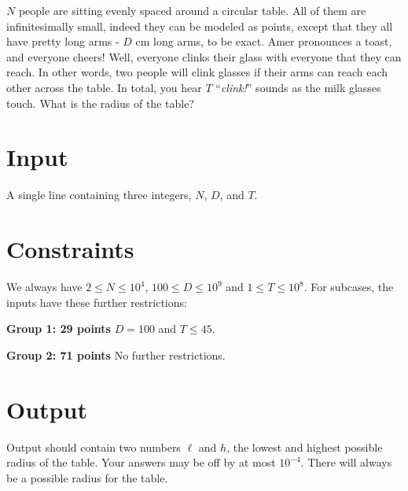 $N$ people are sitting evenly spaced around a circular table. All of them are infinitesimally small, indeed they can be modeled as points, except that they all have pretty long arms - $D$ cm long arms, to be exact. Amer pronounces a toast, and everyone cheers! Well, everyone clinks their glass with everyone that they can reach. In other words, two people will clink glasses if their arms can reach each other across the table. In total, you hear $T$ ``{\em clink!}'' sounds as the milk glasses touch. What is the radius of the table? 

\section*{Input}
A single line containing three integers, $N$, $D$, and $T$.

\section*{Constraints}
We always have $2 \leq N \leq 10^4$, $100 \leq D \leq 10^9$ and $1 \leq T \leq 10^{8}$. For subcases, the inputs have these further restrictions:

\begin{description}
  \item{\textbf{Group 1: 29 points}} $D = 100$ and $T \leq 45$.
  \item{\textbf{Group 2: 71 points}} No further restrictions.
\end{description}

\section*{Output}
Output should contain two numbers $\ell$ and $h$, the lowest and highest possible radius of the table. Your answers may be off by at most $10^{-4}$. There will always be a possible radius for the table.
